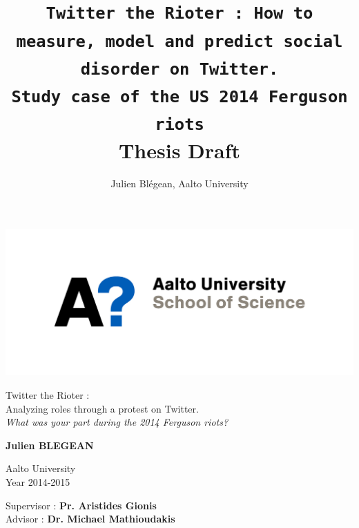 \documentclass[a4paper,twoside,12pt,openright]{report}
\title{\texttt{Twitter the Rioter : How to measure, model and predict social disorder on Twitter. \\Study case of the US 2014 Ferguson riots}\\ \textbf{\Large Thesis Draft}}
\author{Julien Blégean, Aalto University}
\begin{document}
\raggedbottom

\begin{minipage}[t]{0.4\textwidth}
  \flushleft
  \includegraphics [width=\textwidth]{images/aalto_logo_b.png}
\end{minipage}

\vspace{3.5cm}

\begin{center}
\begin{minipage}[t]{0.85\textwidth}
\begin{center}
    {\LARGE {\textsf{Twitter the Rioter :\\[-5pt] Analyzing roles through a protest on Twitter.\\[5pt] \emph{\large What was your part during the 2014 Ferguson riots?}}}}\\
\end{center}
\end{minipage}
\end{center}

\vspace{1cm}

\begin{center}
    \textbf{\large Julien BLEGEAN}
\end{center}

\begin{center}
    \large Aalto University\\
    Year 2014-2015
\end{center}

\thispagestyle{empty}

\vfill

{\large \noindent Supervisor : \textbf{Pr. Aristides Gionis}\\
Advisor : \textbf{Dr. Michael Mathioudakis}}

\newpage

\newpage
\thispagestyle{empty}
\mbox{}
\end{document}
